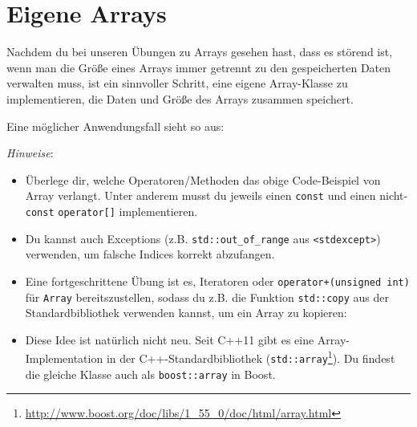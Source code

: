 \section{Eigene Arrays \optional}
\optionaltextbox
\label{sec:array}

Nachdem du bei unseren Übungen zu Arrays gesehen hast, dass es störend ist, wenn man die Größe eines Arrays immer getrennt zu den gespeicherten Daten verwalten muss, ist ein sinnvoller Schritt, eine eigene Array-Klasse zu implementieren, die Daten und Größe des Arrays zusammen speichert.

Eine möglicher Anwendungsfall sieht so aus:



\emph{Hinweise}:
\begin{itemize}
\item
Überlege dir, welche Operatoren/Methoden das obige Code-Beispiel von Array verlangt.
Unter anderem musst du jeweils einen \lstinline{const} und einen nicht-\lstinline{const} \lstinline{operator[]} implementieren.

\item Du kannst auch Exceptions (z.B. \lstinline{std::out_of_range} aus \lstinline{<stdexcept>}) verwenden, um falsche Indices korrekt abzufangen.

\item Eine fortgeschrittene Übung ist es, Iteratoren oder \lstinline{operator+(unsigned int)} für \lstinline{Array} bereitszustellen, sodass du z.B. die Funktion \lstinline{std::copy} aus der Standardbibliothek verwenden kannst, um ein Array zu kopieren:



\item
Diese Idee ist natürlich nicht neu.
Seit C++11 gibt es eine Array-Implementation in der C++-Standardbibliothek (\lstinline{std::array}\footnote{\url{http://www.boost.org/doc/libs/1_55_0/doc/html/array.html}}).
Du findest die gleiche Klasse auch als \lstinline{boost::array} in Boost.
\end{itemize}
